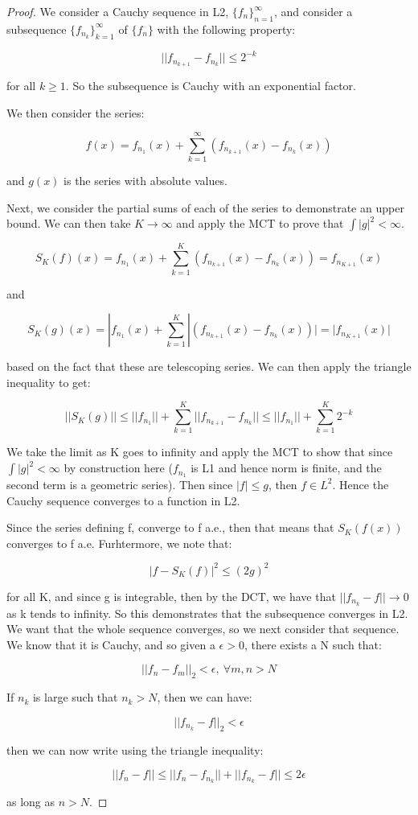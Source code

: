 \documentclass[class=article, crop=false]{standalone}
\begin{document}
		\begin{proof}
			We consider a Cauchy sequence in L2, $\{f_n\}_{n=1}^\infty$, and consider a subsequence $\{f_{n_k}\}_{k=1}^\infty$ of $\{f_n\}$ with the following property:

				$$||f_{n_{k+1}} - f_{n_k}|| \le 2^{-k}$$

			for all $k \ge 1$. So the subsequence is Cauchy with an exponential factor. 

			We then consider the series:

				$$f(x) = f_{n_1}(x) + \sum_{k=1}^\infty (f_{n_{k+1}}(x) - f_{n_k}(x))$$

			and $g(x)$ is the series with absolute values. 

			Next, we consider the partial sums of each of the series to demonstrate an upper bound. We can then take $K \rightarrow \infty$ and apply the MCT to prove that $\int |g|^2 < \infty$. 

				$$S_K(f)(x) = f_{n_1}(x) + \sum_{k=1}^K (f_{n_{k+1}}(x) - f_{n_k}(x)) = f_{n_{K+1}}(x)$$

			and 

				$$S_K(g)(x) = |f_{n_1}(x)  + \sum_{k=1}^K |(f_{n_{k+1}}(x) - f_{n_k}(x))| = |f_{n_{K+1}}(x)|$$

			based on the fact that these are telescoping series. We can then apply the triangle inequality to get:

				$$||S_K(g)|| \le ||f_{n_1}|| + \sum_{k=1}^K ||f_{n_{k+1}} - f_{n_k}|| \le ||f_{n_1}|| + \sum_{k=1}^K 2^{-k}$$

			We take the limit as K goes to infinity and apply the MCT to show that since $\int |g|^2 < \infty$ by construction here ($f_{n_1}$ is L1 and hence norm is finite, and the second term is a geometric series). Then since $|f| \le g$, then $f \in L^2$. Hence the Cauchy sequence converges to a function in L2.

			Since the series defining f, converge to f a.e., then that means that $S_K(f(x))$ converges to f a.e. Furhtermore, we note that:

				$$|f - S_K(f)|^2 \le (2g)^2$$

			for all K, and since g is integrable, then by the DCT, we have that $||f_{n_k} - f|| \rightarrow 0$ as k tends to infinity. So this demonstrates that the subsequence converges in L2. We want that the whole sequence converges, so we next consider that sequence. We know that it is Cauchy, and so given a $\epsilon > 0$, there exists a N such that:

				$$||f_n - f_m||_2 < \epsilon,\ \forall m,n > N$$

			If $n_k$ is large such that $n_k > N$, then we can have:

				$$||f_{n_k} - f||_2 < \epsilon$$

			then we can now write using the triangle inequality:

				$$||f_n - f|| \le ||f_n - f_{n_k}|| + ||f_{n_k} - f|| \le 2 \epsilon$$

			as long as $n > N$.
		\end{proof}
\end{document}
